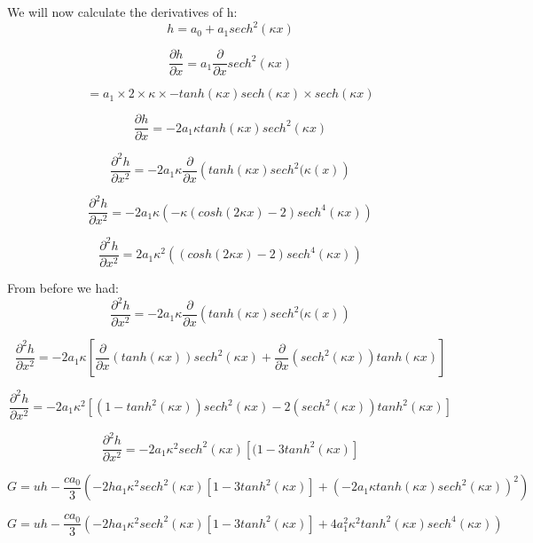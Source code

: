 \documentclass[12pt]{article}
\begin{document}
We will now calculate the derivatives of h:
\[h = a_0 + a_1 sech^2\left(\kappa x\right)\]

\[\frac{\partial h}{\partial x} =  a_1 \frac{\partial }{\partial x}  sech^2\left(\kappa x \right)\]

\[ = a_1 \times 2 \times \kappa \times - tanh(\kappa x)sech(\kappa x) \times sech(\kappa x)\]

\[ \frac{\partial h}{\partial x} = - 2a_1\kappa tanh(\kappa x )sech^2(\kappa x )\]

\[ \frac{\partial^2 h}{\partial x^2} = - 2a_1\kappa \frac{\partial}{\partial x} \left(tanh(\kappa x)sech^2(\kappa(x )\right)\]

\[ \frac{\partial^2 h}{\partial x^2} = - 2a_1\kappa \left(-\kappa \left(cosh(2 \kappa x) - 2\right)sech^4(\kappa x)\right)\]

\[ \frac{\partial^2 h}{\partial x^2} = 2a_1\kappa^2 \left(\left(cosh(2 \kappa x) - 2\right)sech^4(\kappa x)\right)\]

From before we had:
\[ \frac{\partial^2 h}{\partial x^2} = - 2a_1\kappa \frac{\partial}{\partial x} \left(tanh(\kappa x)sech^2(\kappa(x )\right)\]

\[ \frac{\partial^2 h}{\partial x^2} = - 2a_1\kappa \left[ \frac{\partial}{\partial x}\left(tanh(\kappa x )\right)sech^2( \kappa x)  + \frac{\partial}{\partial x}\left(sech^2(\kappa x)\right)tanh(\kappa x ) \right] \]


\[ \frac{\partial^2 h}{\partial x^2} = - 2a_1\kappa^2 \left[ \left( 1-tanh^2(\kappa x )\right)sech^2( \kappa x)  -2 \left(sech^2(\kappa x)\right)tanh^2(\kappa x ) \right] \]

\[ \frac{\partial^2 h}{\partial x^2} = - 2a_1\kappa^2 sech^2( \kappa x) \left[ ( 1-3tanh^2(\kappa x ) \right] \]


\[G =  uh - \frac{ca_0}{3} \left( - 2ha_1\kappa^2 sech^2( \kappa x) \left[ 1-3tanh^2(\kappa x ) \right] + \left(- 2a_1\kappa tanh(\kappa x )sech^2(\kappa x )\right)^2  \right)  \]

\[G =  uh - \frac{ca_0}{3} \left( - 2ha_1\kappa^2 sech^2( \kappa x) \left[ 1-3tanh^2(\kappa x ) \right] + 4a_1^2\kappa^2 tanh^2(\kappa x )sech^4(\kappa x )  \right)  \]
\end{document}
